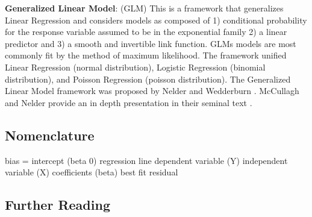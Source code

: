 \begin{bibunit}



\textbf{Generalized Linear Model}: (GLM) This is a framework that generalizes Linear Regression and considers models as composed of 1) conditional probability for the response variable assumed to be in the exponential family 2) a linear predictor and 3) a smooth and invertible link function. GLMs models are most commonly fit by the method of maximum likelihood. The framework unified Linear Regression (normal distribution), Logistic Regression (binomial distribution), and Poisson Regression (poisson distribution). The Generalized Linear Model framework was proposed by Nelder and Wedderburn \cite{Nelder1972}. McCullagh and Nelder provide an in depth presentation in their seminal text \cite{McCullagh1989}.


\subsection{Nomenclature}

bias = intercept (beta 0)
regression line
dependent variable (Y)
independent variable (X)
coefficients (beta)
best fit
residual



\subsection{Further Reading}



\putbib
\end{bibunit}

\newpage\begin{bibunit}\putbib\end{bibunit}
\newpage\begin{bibunit}\putbib\end{bibunit}
\newpage\begin{bibunit}\putbib\end{bibunit}
\newpage\begin{bibunit}\putbib\end{bibunit}
\newpage\begin{bibunit}\putbib\end{bibunit}

